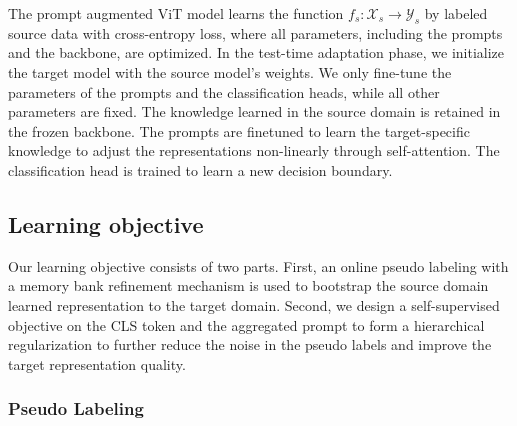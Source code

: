 \documentclass{article} \usepackage{iclr2023_conference,times}
\def\gX{{\mathcal{X}}}
\def\gY{{\mathcal{Y}}}
\begin{document}
The prompt augmented ViT model learns the function $f_s: \displaystyle \gX_s \rightarrow \displaystyle \gY_s $ by labeled source data with cross-entropy loss, where all parameters, including the prompts and the backbone, are optimized. In the test-time adaptation phase, we initialize the target model with the source model's weights. We only fine-tune the parameters of the prompts and the classification heads, while all other parameters are fixed. The knowledge learned in the source domain is retained in the frozen backbone. The prompts are finetuned to learn the target-specific knowledge to adjust the representations non-linearly through self-attention. The classification head is trained to learn a new decision boundary.



\subsection{Learning objective} 
Our learning objective consists of two parts. First, an online pseudo labeling with a memory bank refinement mechanism is used to bootstrap the source domain learned representation to the target domain. Second, we design a self-supervised objective on the CLS token and the aggregated prompt to form a hierarchical regularization to further reduce the noise in the pseudo labels and improve the target representation quality.

\subsubsection{Pseudo Labeling}
\end{document}
